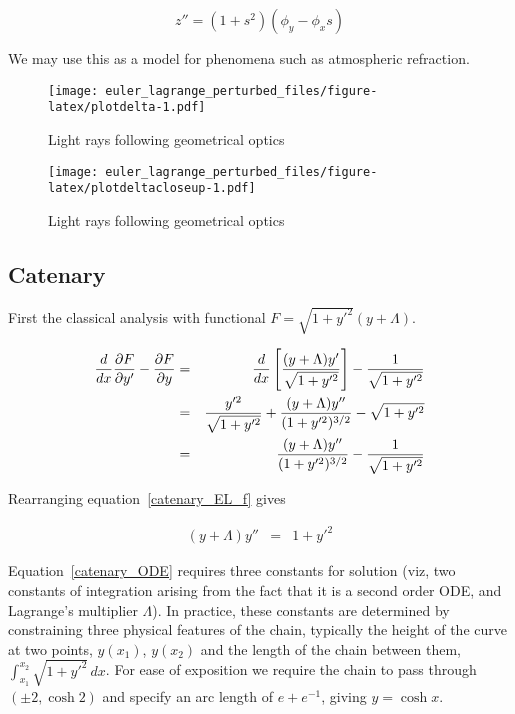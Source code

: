 \documentclass[pdflatex,sn-mathphys-num]{sn-jnl}%
\theoremstyle{thmstyleone}%
\theoremstyle{thmstyletwo}%
\theoremstyle{thmstylethree}%
\begin{document}
\begin{equation}
  z'' = (1+s^2)(\phi_y-\phi_xs)
\end{equation}

We may use this as a model for phenomena such as atmospheric refraction.


\begin{figure}[h]
\centering
\texttt{[image: euler\_lagrange\_perturbed\_files/figure-latex/plotdelta-1.pdf]}
\caption{Light rays following geometrical optics}\label{plotdelta}
\end{figure}

\begin{figure}[h]
\centering
\texttt{[image: euler\_lagrange\_perturbed\_files/figure-latex/plotdeltacloseup-1.pdf]}
\caption{Light rays following geometrical optics}\label{plotdeltacloseup}
\end{figure}


\subsection{Catenary}

First the classical analysis with functional
$F=\sqrt{1+y'^2}(y+\Lambda)$.

\begin{eqnarray}
  \frac{d}{dx}\frac{\partial{F}}{\partial{y'}} - \frac{\partial{F}}{\partial{y}}
  &=& 
  \frac{d}{dx}\left[\frac{(y+\Lambda)y'}{\sqrt{1+y'^2}}\right] -  \frac{1}{\sqrt{1+y'^2}}\nonumber\\
&=&   \frac{y'^2}{\sqrt{1+y'^2}} + \frac{(y+\Lambda)y''}{(1+y'^2)^{3/2}} - \sqrt{1+y'^2}\nonumber\\
  &=&   \frac{(y+\Lambda)y''}{(1+y'^2)^{3/2}} - \frac{1}{\sqrt{1+y'^2}}
  \label{catenary_EL_f}
\end{eqnarray}

Rearranging equation~\ref{catenary_EL_f} gives

\begin{eqnarray}
  (y+\Lambda)y'' &=& 1+y'^2\label{catenary_ODE}
\end{eqnarray}

Equation~\ref{catenary_ODE} requires three constants for solution
(viz, two constants of integration arising from the fact that it is a
second order ODE, and Lagrange's multiplier $\Lambda$).  In practice,
these constants are determined by constraining three physical features
of the chain, typically the height of the curve at two points,
$y(x_1)$, $y(x_2)$ and the length of the chain between them,
$\int_{x_1}^{x_2}\sqrt{1+y'^2}\,dx$.  For ease of exposition we
require the chain to pass through $(\pm 2,\cosh 2)$ and specify an arc
length of $e+e^{-1}$, giving $y=\cosh x$.
\end{document}
